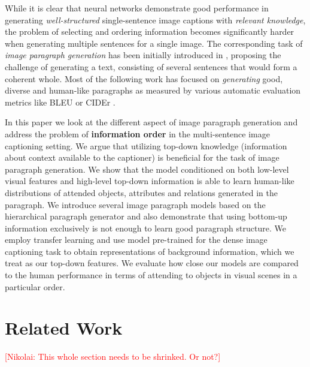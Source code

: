 \documentclass[11pt,a4paper]{article}
\newcommand{\kibitz}[2]{\ifnum\Comments=1\textcolor{#1}{#2}\fi}
\newcommand{\nikolai}[1]{\kibitz{red}      {[Nikolai: #1]}}
\begin{document}
While it is clear that neural networks demonstrate good performance in generating \textit{well-structured} single-sentence image captions with \textit{relevant knowledge}, the problem of selecting and ordering information becomes significantly harder when generating multiple sentences for a single image. The corresponding task of
\textit{image paragraph generation} has been initially introduced in , proposing the challenge of generating a text, consisting of several sentences that would form a coherent whole.
Most of the following work \cite{liang2017recurrent,chatterjee2018diverse,wang2019convolutional} has focused on \textit{generating} good, diverse and human-like paragraphs as measured by various automatic evaluation metrics like BLEU \cite{bleu} or CIDEr \cite{vedantam2014cider}.

In this paper we look at the different aspect of image paragraph generation and address the problem of \textbf{information order} in the multi-sentence image captioning setting.
We argue that utilizing top-down knowledge (information about context available to the captioner) is beneficial for the task of image paragraph generation.
We show that the model conditioned on both low-level visual features and high-level top-down information is able to learn human-like distributions of attended objects, attributes and relations generated in the paragraph.
We introduce several image paragraph models based on the hierarchical paragraph generator  and also
demonstrate that using bottom-up information exclusively is not enough to learn good paragraph structure.
We employ transfer learning and use model pre-trained for the dense image captioning task \cite{densecap} to obtain representations of background information, which we treat as our top-down features.
We evaluate how close our models are compared to the human performance in terms of attending to objects in visual scenes in a particular order.


\section{Related Work}

\nikolai{This whole section needs to be shrinked. Or not?}
\end{document}
